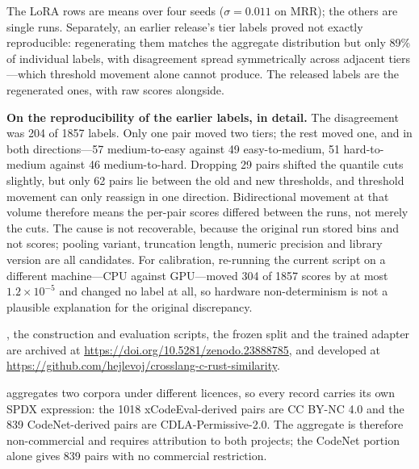 The LoRA rows are means
over four seeds ($\sigma = 0.011$ on MRR); the others are single runs.
Separately, an earlier release's tier labels proved not exactly reproducible:
regenerating them matches the aggregate distribution but only 89\% of individual
labels, with disagreement spread symmetrically across adjacent tiers---which
threshold movement alone cannot produce. The released labels are the
regenerated ones, with raw scores alongside.

\ifextended

\textbf{On the reproducibility of the earlier labels, in detail.} The
disagreement was 204 of 1857 labels. Only one pair moved two tiers; the rest
moved one, and in both directions---57 medium-to-easy against 49
easy-to-medium, 51 hard-to-medium against 46 medium-to-hard. Dropping 29 pairs
shifted the quantile cuts slightly, but only 62 pairs lie between the old and
new thresholds, and threshold movement can only reassign in one direction.
Bidirectional movement at that volume therefore means the per-pair scores
differed between the runs, not merely the cuts. The cause is not recoverable,
because the original run stored bins and not scores; pooling variant,
truncation length, numeric precision and library version are all candidates.
For calibration, re-running the current script on a different machine---CPU
against GPU---moved 304 of 1857 scores by at most $1.2 \times 10^{-5}$ and
changed no label at all, so hardware non-determinism is not a plausible
explanation for the original discrepancy.
\fi

\dsname{}, the construction and evaluation scripts, the frozen split and the
trained adapter are archived at
\url{https://doi.org/10.5281/zenodo.23888785}, and developed at
\url{https://github.com/hejlevoj/crosslang-c-rust-similarity}.

\dsname{} aggregates two corpora under different
licences, so every record carries its own SPDX expression: the 1018
xCodeEval-derived pairs are CC BY-NC 4.0 and the 839 CodeNet-derived pairs are
CDLA-Permissive-2.0. The aggregate is therefore non-commercial and requires
attribution to both projects; the CodeNet portion alone gives 839 pairs with no
commercial restriction.






